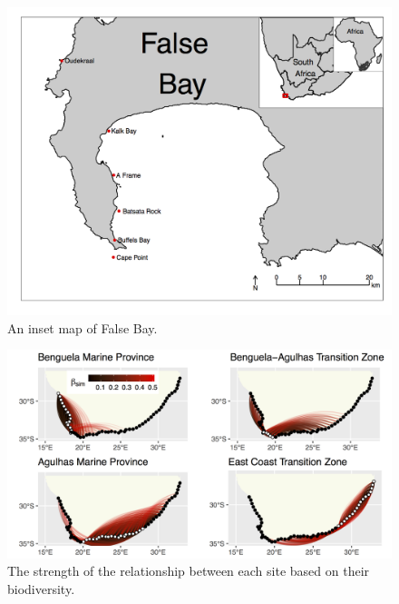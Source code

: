 \documentclass[]{book}
\theoremstyle{definition}
\theoremstyle{definition}
\theoremstyle{definition}
\theoremstyle{remark}
\begin{document}
\begin{figure}

{\centering \includegraphics[width=1\linewidth]{figures/false_bay_inset_map_labels2} 

}

\caption{An inset map of False Bay.}\label{fig:example5}
\end{figure}

\begin{figure}

{\centering \includegraphics[width=1\linewidth]{figures/PLOS_ONE_Fig4} 

}

\caption{The strength of the relationship between each site based on their biodiversity.}\label{fig:example19}
\end{figure}
\end{document}

